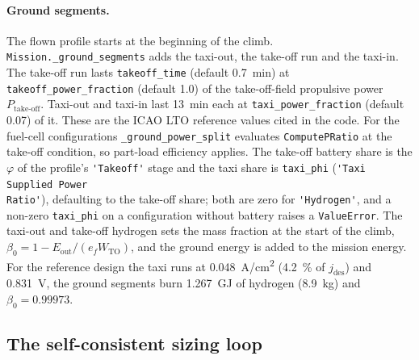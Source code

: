\documentclass[a4paper,11pt]{article}
\newcommand{\code}[1]{\nolinkurl{#1}}
\newcommand{\fn}[1]{\nolinkurl{#1}}
\newcommand{\jdes}{j_\mathrm{des}}
\begin{document}
\paragraph{Ground segments.} The flown profile starts at the beginning of the climb.
\fn{Mission._ground_segments} adds the taxi-out, the take-off run and the taxi-in. The take-off
run lasts \code{takeoff_time} (default \SI{0.7}{min}) at \code{takeoff_power_fraction}
(default 1.0) of the take-off-field propulsive power $P_\mathrm{take\text{-}off}$. Taxi-out and
taxi-in last \SI{13}{min} each at \code{taxi_power_fraction} (default 0.07) of it. These are
the ICAO LTO reference values cited in the code. For the fuel-cell configurations
\fn{_ground_power_split} evaluates \fn{ComputePRatio} at the take-off condition, so part-load
efficiency applies. The take-off battery share is the $\varphi$ of the profile's
\code{'Takeoff'} stage and the taxi share is \code{taxi_phi} (\code{'Taxi Supplied Power
Ratio'}), defaulting to the take-off share; both are zero for \code{'Hydrogen'}, and a non-zero
\code{taxi_phi} on a configuration without battery raises a \code{ValueError}. The taxi-out and
take-off hydrogen sets the mass fraction at the start of the climb,
$\beta_0 = 1 - E_\mathrm{out}/(e_f W_\mathrm{TO})$, and the ground energy is added to the
mission energy. For the reference design the taxi runs at \SI{0.048}{A/cm^2}
(\SI{4.2}{\percent} of $\jdes$) and \SI{0.831}{V}, the ground segments burn
\SI{1.267}{GJ} of hydrogen (\SI{8.9}{kg}) and $\beta_0=0.99973$.

\subsection{The self-consistent sizing loop}
\label{sec:loop}
\end{document}

